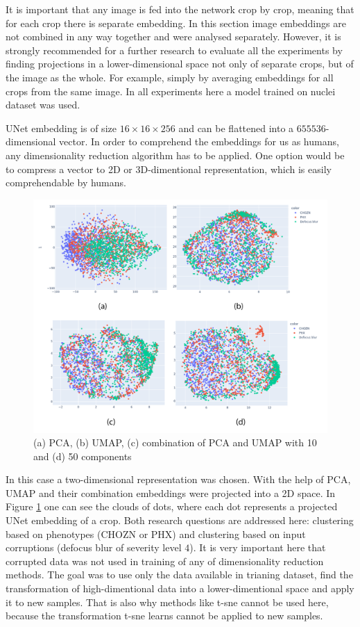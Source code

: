 It is important that any image is fed into the network crop by crop, meaning that for each crop there is separate embedding. In this section image embeddings are not combined in any way together and were analysed separately. However, it is strongly recommended for a further research to evaluate all the experiments by finding projections in a lower-dimensional space not only of separate crops, but of the image as the whole. For example, simply by averaging embeddings for all crops from the same image. In all experiments here a model trained on nuclei dataset was used.

UNet embedding is of size $16 \times 16 \times 256$ and can be flattened into a $655536$-dimensional vector. In order to comprehend the embeddings for us as humans, any dimensionality reduction algorithm has to be applied. One option would be to compress a vector to 2D or 3D-dimentional representation, which is easily comprehendable by humans.
\begin{figure}[htb]
	\includegraphics[width=\linewidth]{bilder/unet-embeddings/umap-pca-embeddings.png}
	\caption{(a) PCA, (b) UMAP, (c) combination of PCA and UMAP with 10 and (d) 50 components}\label{fig:umap-pca-embeddings}
\end{figure}

In this case a two-dimensional representation was chosen. With the help of PCA, UMAP and their combination embeddings were projected into a 2D space. In Figure \ref{fig:umap-pca-embeddings} one can see the clouds of dots, where each dot represents a projected UNet embedding of a crop. Both research questions are addressed here: clustering based on phenotypes (CHOZN or PHX) and clustering based on input corruptions (defocus blur of severity level $4$). It is very important here that corrupted data was not used in training of any of dimensionality reduction methods. The goal was to use only the data available in trianing dataset, find the transformation of high-dimentional data into a lower-dimentional space and apply it to new samples. That is also why methods like t-sne \cite{t-sne} cannot be used here, because the transformation t-sne learns cannot be applied to new samples. 

